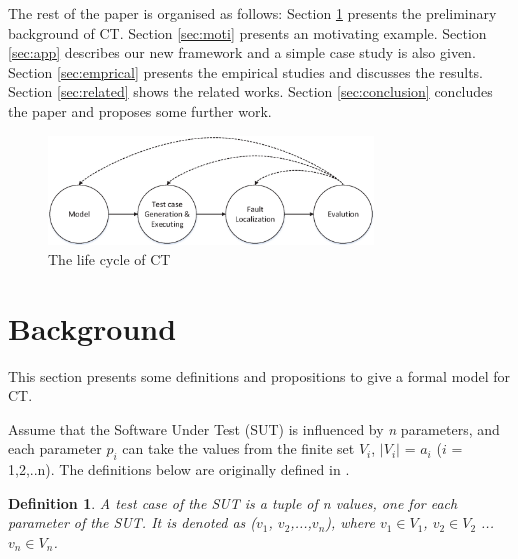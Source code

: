 \documentclass[10pt,journal,compsoc]{IEEEtran}
\begin{document}
The rest of the paper is organised as follows: Section \ref{sec:back} presents the preliminary background of CT. Section \ref{sec:moti} presents an motivating example. Section \ref{sec:app} describes our new framework and a simple case study is also given. Section \ref{sec:emprical} presents the empirical studies and discusses the results. Section \ref{sec:related} shows the related works. Section \ref{sec:conclusion} concludes the paper and proposes some further work.


\begin{figure}
 \includegraphics[width=3.4in]{CT_lifecircle.eps}
\caption{The life cycle of CT}
\label{ct-life}
\end{figure}





\section{Background}\label{sec:back}
This section presents some definitions and propositions to give a formal model for CT.


Assume that the Software Under Test (SUT) is influenced by \emph{n} parameters, and each parameter $p_{i}$ can take the values from the finite set $V_{i}$, $|V_{i}|$ = $a_{i}$ ($i$ = 1,2,..n). The definitions below are originally defined in \cite{nie2011minimal}.

\newtheorem{definition}{Definition}
\begin{definition}
A \emph{test case} of the SUT is a tuple of \emph{n} values, one for each parameter of the SUT. It is denoted as  ($v_{1}$, $v_{2}$,...,$v_{n}$), where $v_{1}\in V_{1}$, $v_{2} \in V_{2}$ ... $v_{n} \in V_{n}$.
\end{definition}
\end{document}
